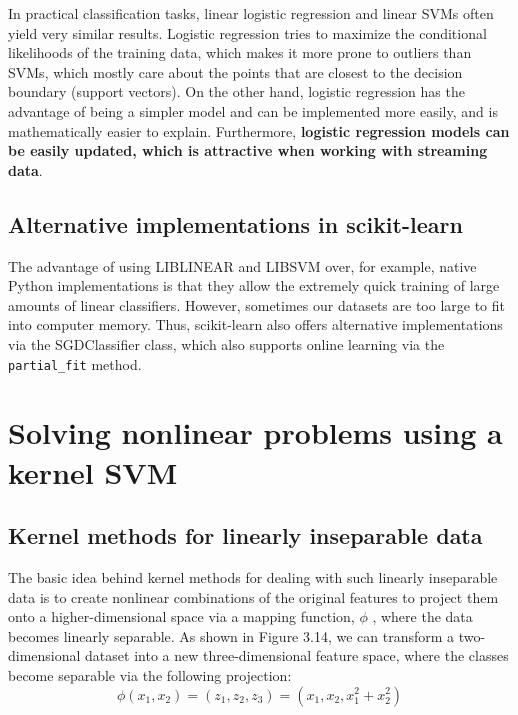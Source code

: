 
\begin{tcolorbox}[title=Logistic regression versus SVMs]

    In practical classification tasks, linear logistic regression and linear SVMs often yield very similar results. Logistic regression tries to maximize the conditional likelihoods of the training data, which makes it more prone to outliers than SVMs, which mostly care about the points that are closest to the decision boundary (support vectors). On the other hand, logistic regression has the advantage of being a simpler model and can be implemented more easily, and is mathematically easier to explain. Furthermore, \textbf{logistic regression models can be easily updated, which is attractive when working with streaming data}.
\end{tcolorbox}
\subsection{Alternative implementations in scikit-learn}
The advantage of using LIBLINEAR and LIBSVM over, for example, native Python implementations is that they allow the extremely quick training of large amounts of linear classifiers. However, sometimes our datasets are too large to fit into computer memory. Thus, scikit-learn also offers alternative implementations via the SGDClassifier class, which also supports online learning via the \verb|partial_fit| method.
\section{Solving nonlinear problems using a kernel SVM}
\subsection{Kernel methods for linearly inseparable data}
The basic idea behind kernel methods for dealing with such linearly inseparable data is to create nonlinear combinations of the original features to project them onto a higher-dimensional space via a mapping function, $\phi$ , where the data becomes linearly separable. As shown in Figure 3.14, we can transform a two-dimensional dataset into a new three-dimensional feature space, where the classes become separable via the following projection:
$$\phi(x_1,x_2)=(z_1,z_2,z_3)=(x_1,x_2, x_1^2+x_2^2)$$

